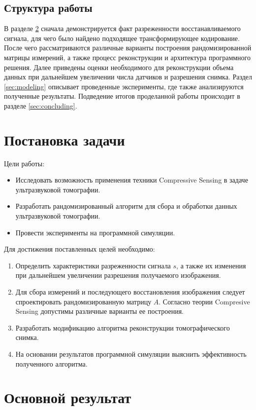 \documentclass[14pt]{matmex-diploma}
\begin{document}
\subsection{Структура работы}
В разделе \ref{sec:main_result} сначала демонстрируется факт разреженности восстанавливаемого сигнала, для чего было найдено подходящее трансформирующее кодирование. После чего рассматриваются различные варианты построения рандомизированной матрицы измерений, а также процесс реконструкции и архитектура программного решения. Далее приведены оценки необходимого для реконструкции объема данных при дальнейшем увеличении числа датчиков и разрешения снимка. Раздел \ref{sec:modeling} описывает проведенные эксперименты, где также анализируются полученные результаты. Подведение итогов проделанной работы происходит в разделе \ref{sec:concluding}.

\section{Постановка задачи}
Цели работы:
\begin{itemize}
  \item Исследовать возможность применения техники Compres\-sive Sen\-sing в задаче ультразвуковой томографии.
  \item Разработать рандомизированный алгоритм для сбора и обработки данных ультразвуковой томографии.
  \item Провести эксперименты на программной симуляции.
\end{itemize}

Для достижения поставленных целей необходимо:
\begin{enumerate}
\item Определить характеристики разреженности сигнала $s$, а также их изменения при дальнейшем увеличении разрешения получаемого изображения.
\item Для сбора измерений и последующего восстановления изображения следует спроектировать рандомизированную матрицу $A$. Согласно теории Compresive Sensing допустимы различные варианты ее построения.
\item Разработать модификацию алгоритма реконструкции томографического снимка.
\item На основании результатов программной симуляции выяснить эффективность полученного алгоритма.
\end{enumerate}



\section{Основной результат} \label{sec:main_result}
\end{document}
